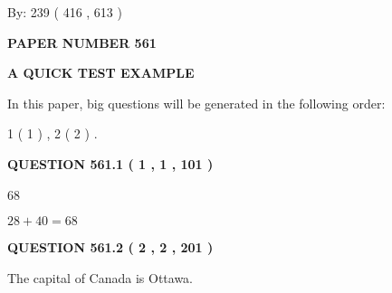 \documentclass[12pt]{article}
\begin{document}
   
\hspace{1.0in} By: 
 239 ( 416 ,  613 )
   
   
   
   
\newpage 
\setcounter{page}{ 
   561001 } 
   
   
   
   
 {\textbf{ \Large{ PAPER NUMBER  561  }}}
   
   
\vspace{0.2in}
   
   
   
   
   
   
 \vspace{0.2in}
{\LARGE {\textbf{ A QUICK TEST EXAMPLE}}}
   
   
   
\vspace{0.2in}
   
In this paper, big questions will be generated in the following order: 
   
   
   1 ( 1 )
 ,
   2 ( 2 )
 .
  
\vspace{0.2in}
  
{\textbf{\Large{QUESTION
561.1 
 ( 1 , 1 , 101 )
}}}
  
  
 
 
\noindent{}

68
 
 
 
 
\noindent{}

$ %
28 +  %
40=   %
68$
 
 
  
\vspace{0.2in}
  
{\textbf{\Large{QUESTION
561.2 
 ( 2 , 2 , 201 )
}}}
  
  
 
 
\noindent{}
 
 
The capital of Canada is Ottawa.
 
 
 
 
   
   
 \vspace{0.2in}
 
\end{document}

